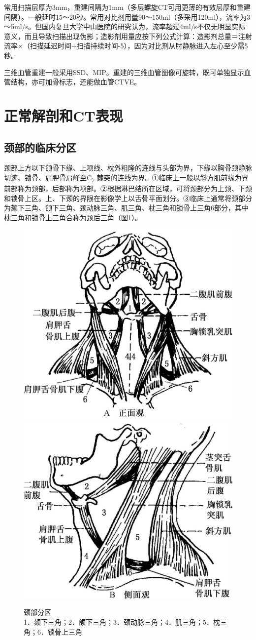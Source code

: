 常用扫描层厚为3mm，重建间隔为1mm（多层螺旋CT可用更薄的有效层厚和重建间隔）。一般延时15～20秒。常用对比剂用量90～150ml（多采用120ml），流率为3～5ml/s。但国内复旦大学中山医院的研究认为，流率超过4ml/s不仅无明显实际意义，而且导致扫描出现伪影；造影剂用量应按下列公式计算：造影剂总量＝注射流率×（扫描延迟时间+扫描持续时间-5），因为对比剂从肘静脉进入左心至少需5秒。

三维血管重建一般采用SSD、MIP。重建的三维血管图像可旋转，既可单独显示血管结构，亦可加骨标志，还能做血管CTVE。

\section{正常解剖和CT表现}

\subsection{颈部的临床分区}

颈部上方以下颌骨下缘、上项线、枕外粗隆的连线与头部为界，下缘以胸骨颈静脉切迹、锁骨、肩胛骨肩峰至C\textsubscript{7}
棘突的连线为界。①临床上一般以斜方肌前缘为界前部称为颈部，后部称为项部。②根据淋巴结所在区域，可将颈部分为上颈、下颈和锁骨上区。上、下颈的界限在影像学上以舌骨平面划分。③临床上通常将颈部分为颏下三角、颌下三角、颈动脉三角、肌三角、枕三角和锁骨上三角6部分，其中枕三角和锁骨上三角合称为颈后三角（图\ref{fig8-1}）。



\begin{figure}[!htbp]
 \centering
 \includegraphics[width=.5\textwidth,height=.5\textheight,keepaspectratio]{./images/Image00166.jpg}
 \includegraphics[width=.5\textwidth,height=.5\textheight,keepaspectratio]{./images/Image00167.jpg}
 \captionsetup{justification=centering}
 \caption{颈部分区\\{\small 1．颏下三角；2．颌下三角；3．颈动脉三角；4．肌三角；5．枕三角；6．锁骨上三角}}
 \label{fig8-1}
  \end{figure} 

